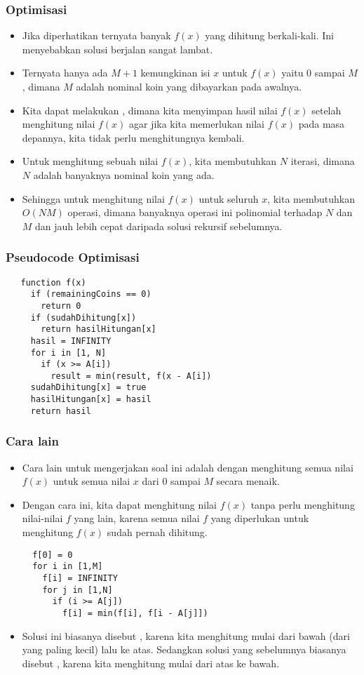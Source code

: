 \begin{frame}
\frametitle{Optimisasi}
\begin{itemize}
  \item Jika diperhatikan ternyata banyak $f(x)$ yang dihitung berkali-kali. Ini menyebabkan solusi berjalan sangat lambat.
  \item Ternyata hanya ada $M + 1$ kemungkinan isi $x$ untuk $f(x)$ yaitu $0$ sampai $M$, dimana $M$ adalah nominal koin yang dibayarkan pada awalnya.
  \item Kita dapat melakukan , dimana kita menyimpan hasil nilai $f(x)$ setelah menghitung nilai $f(x)$ agar jika kita memerlukan nilai $f(x)$ pada masa depannya, kita tidak perlu menghitungnya kembali.
  \item Untuk menghitung sebuah nilai $f(x)$, kita membutuhkan $N$ iterasi, dimana $N$ adalah banyaknya nominal koin yang ada.
  \item Sehingga untuk menghitung nilai $f(x)$ untuk seluruh $x$, kita membutuhkan $O(NM)$ operasi, dimana banyaknya operasi ini polinomial terhadap $N$ dan $M$ dan jauh lebih cepat daripada solusi rekursif sebelumnya.
\end{itemize}
\end{frame}

\begin{frame} [fragile]
\frametitle{Pseudocode Optimisasi}
\begin{lstlisting}
   function f(x)
     if (remainingCoins == 0)
       return 0
     if (sudahDihitung[x])
       return hasilHitungan[x]
     hasil = INFINITY
     for i in [1, N]
       if (x >= A[i])
         result = min(result, f(x - A[i])
     sudahDihitung[x] = true
     hasilHitungan[x] = hasil
     return hasil
\end{lstlisting}
\end{frame}

\begin{frame} [fragile]
\frametitle{Cara lain}
\begin{itemize}
  \item Cara lain untuk mengerjakan soal ini adalah dengan menghitung semua nilai $f(x)$ untuk semua nilai $x$ dari $0$ sampai $M$ secara menaik.
  \item Dengan cara ini, kita dapat menghitung nilai $f(x)$ tanpa perlu menghitung nilai-nilai $f$ yang lain, karena semua nilai $f$ yang diperlukan untuk menghitung $f(x)$ sudah pernah dihitung.
\begin{lstlisting}
  f[0] = 0
  for i in [1,M]
    f[i] = INFINITY
    for j in [1,N]
      if (i >= A[j])
        f[i] = min(f[i], f[i - A[j]])
\end{lstlisting}
  \item Solusi ini biasanya disebut , karena kita menghitung mulai dari bawah (dari yang paling kecil) lalu ke atas. Sedangkan solusi yang sebelumnya biasanya disebut , karena kita menghitung mulai dari atas ke bawah.
\end{itemize}
\end{frame}


